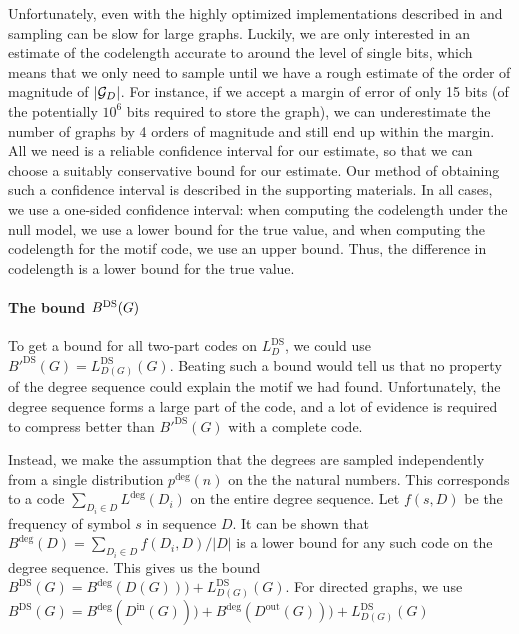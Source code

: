 
Unfortunately, even with the highly optimized implementations described in \cite{charo2010efficient} and \cite{kim2012constructing} sampling can be slow for large graphs. Luckily, we are only interested in an estimate of the codelength accurate to around the level of single bits, which means that we only need to sample until we have a rough estimate of the order of magnitude of $|{\mathcal G}_D|$. For instance, if we accept a margin of error of only 15 bits (of the potentially $10^6$ bits required to store the graph), we can underestimate the number of graphs by 4 orders of magnitude and still end up within the margin. All we need is a reliable confidence interval for our estimate, so that we can choose a suitably conservative bound for our estimate. Our method of obtaining such a confidence interval is described in the supporting materials. In all cases, we use a one-sided confidence interval: when computing the codelength under the null model, we use a lower bound for the true value, and when computing the codelength for the motif code, we use an upper bound. Thus, the difference in codelength is a lower bound for the true value.

\paragraph{The bound $B^\textnormal{DS}(G)$} To get a bound for all two-part codes on $L^\text{DS}_D$, we could use ${B'}^\text{DS}(G) = L^\text{DS}_{D(G)}(G)$. Beating such a bound would tell us that no property of the degree sequence could explain the motif we had found. Unfortunately, the degree sequence forms a large part of the code, and a lot of evidence is required to compress better than ${B'}^\text{DS}(G)$ with a complete code. 

Instead, we make the assumption that the degrees are sampled independently from a single distribution $p^\text{deg}(n)$ on the the natural numbers. This corresponds to a code $\sum_{D_i \in D}L^\text{deg}(D_i)$ on the entire degree sequence. Let $f(s, D)$ be the frequency of symbol $s$ in sequence $D$. It can be shown that $B^\text{deg}(D) = \sum_{D_i \in D} f(D_i, D)/|D|$ is a lower bound for any such code on the degree sequence. This gives us the bound $B^\text{DS}(G) = B^\text{deg}(D(G))) + L^\text{DS}_{D(G)}(G)$. For directed graphs, we use $B^\text{DS}(G) = B^\text{deg}(D^\text{in}(G))) + B^\text{deg}(D^\text{out}(G))) + L^\text{DS}_{D(G)}(G)$

